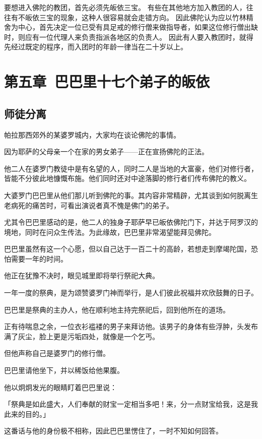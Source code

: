 \documentclass[twoside,openany]{book}
\begin{document}
要想进入佛陀的教团，首先必须先皈依三宝。
有些在其他地方加入教团的人，往往有不皈依三宝的现象，这种人很容易就会走错方向。
因此佛陀认为应以竹林精舍为中心，首先决定一位已受有具足戒的修行僧来做指导者，如果这位修行僧出缺时，则应有一位代理人来负责指派各地区的负责人。
因此有人要入教团时，就得先经过既定的程序，而入团时的年龄一律当在二十岁以上。

\chapter{第五章\ 巴巴里十七个弟子的皈依}\label{ch5}

\section{师徒分离}\label{sec5.1}

帕拉那西郊外的某婆罗城内，大家均在谈论佛陀的事情。

因为耶萨的父母亲一个在家的男女弟子——正在宣扬佛陀的正法。

他二人在婆罗门教徒中是有名望的人，同时二人是当地的大富豪，他们对修行者，皆能不分彼此地慷慨布施。他们同时还对中途落脚的修行者们传布佛陀的教义。

大婆罗门巴巴里从他们那儿听到佛陀的事。其内容非常精辟，尤其谈到如何脱离生老病死的痛苦时，可看出演说者真不愧是佛门的弟子。

尤其令巴巴里感动的是，他二人的独身子耶萨早已皈依佛陀门下，并达于阿罗汉的境地，同时在问众生传法。为此缘故，巴巴里非常渴望能拜见佛陀。

巴巴里虽然有这一个心愿，但以自己达于一百二十的高龄，若想走到摩竭陀国，恐怕需要一年的时间。

他正在犹豫不决时，眼见城里即将举行祭祀大典。

一年一度的祭典，是为颂赞婆罗门神而举行，是人们彼此祝福并欢欣鼓舞的日子。

巴巴里是祭典的主办人，他在顺利地主持完祭祀后，回到他所在的道场。

正有待喘息之余，一位衣衫褴褛的男子来拜访他。该男子的身体有些浮肿，头发布满了灰尘，脸上更是污垢四处，就像是一个乞丐。

但他声称自己是婆罗门的修行僧。

巴巴里请他坐下，并以稀饭给他果腹。

他以炯炯发光的眼睛盯着巴巴里说：

「祭典是如此盛大，人们奉献的财宝一定相当多吧！来，分一点财宝给我，这是我此来的目的。」

这番话与他的身份极不相称，因此巴巴里愣住了，一时不知如何回答。
\end{document}
